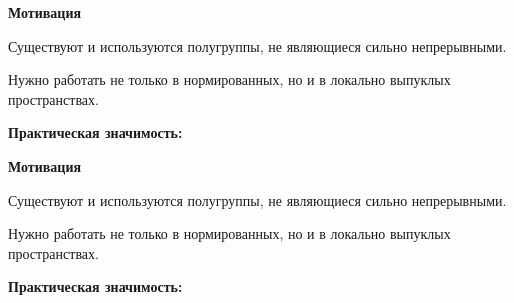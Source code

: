 \documentclass[11pt]{article}
\begin{document}
\newpage

\begin{center}
{\color{notaeYELLOW}\bfseries\fontsize{44}{52}\selectfont Мотивация}
\end{center}
\vspace*{\fill}
\begin{center}
\fontsize{36}{43}\selectfont
\parbox{\linewidth}{\centering\noindent Существуют и используются полугруппы, не являющиеся сильно непрерывными.
\par}\vspace{0.4in}
\parbox{\linewidth}{\centering\noindent Нужно работать не только в нормированных, но и в локально выпуклых пространствах.
\par}\vspace{0.4in}
\parbox{\linewidth}{\centering\noindent \textbf{Практическая значимость:}
\par}\vspace{0.4in}
\end{center}
\vspace*{\fill}

\newpage

\begin{center}
{\color{notaeYELLOW}\bfseries\fontsize{44}{52}\selectfont Мотивация}
\end{center}
\vspace*{\fill}
\begin{center}
\fontsize{36}{43}\selectfont
\parbox{\linewidth}{\centering\noindent Существуют и используются полугруппы, не являющиеся сильно непрерывными.
\par}\vspace{0.4in}
\parbox{\linewidth}{\centering\noindent Нужно работать не только в нормированных, но и в локально выпуклых пространствах.
\par}\vspace{0.4in}
\parbox{\linewidth}{\centering\noindent \textbf{Практическая значимость:}
\par}\vspace{0.4in}
\parbox{\linewidth}{\centering{}
\par}\vspace{0.4in}
\end{center}
\vspace*{\fill}

\newpage
\end{document}
